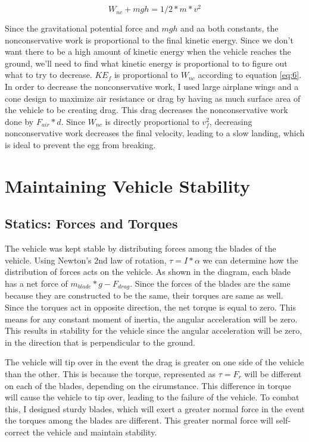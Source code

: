 \documentclass[12pt]{report}
\begin{document}
\begin{equation} \label{eq:6}
W_{nc}+mgh = 1/2*m*v^2
\end{equation}

Since the gravitational potential force and $mgh$ and aa both constants, the nonconservative work is proportional to the final kinetic energy. Since we don't want there to be a high amount of kinetic energy when the vehicle reaches the ground, we'll need to find what kinetic energy is proportional to to figure out what to try to decrease. $KE_f$ is proportional to $W_{nc}$ according to equation \ref{eq:6}. In order to decrease the nonconservative work, I used large airplane wings and a cone design to maximize air resistance or drag by having as much surface area of the vehicle to be creating drag. This drag decreases the nonconservative work done by $F_{air}*d$. Since $W_{nc}$ is directly proportional to $v_f^2$, decreasing nonconservative work decreases the final velocity, leading to a slow landing, which is ideal to prevent the egg from breaking.



\chapter{Maintaining Vehicle Stability}
\section{Statics: Forces and Torques}
The vehicle was kept stable by distributing forces among the blades of the vehicle. Using Newton's 2nd law of rotation, $\tau = I*\alpha$ we can determine how the distribution of forces acts on the vehicle. As shown in the diagram, each blade has a net force of $m_{blade}*g - F_{drag}$. Since the forces of the blades are the same because they are constructed to be the same, their torques are same as well. Since the torques act in opposite direction, the net torque is equal to zero. This means for any constant moment of inertia, the angular acceleration will be zero. This results in stability for the vehicle since the angular acceleration will be zero, in the direction that is perpendicular to the ground.

The vehicle will tip over in the event the drag is greater on one side of the vehicle than the other. This is because the torque, represented as $\tau = F_r$ will be different on each of the blades, depending on the cirumstance. This difference in torque will cause the vehicle to tip over, leading to the failure of the vehicle. To combat this, I designed sturdy blades, which will exert a greater normal force in the event the torques among the blades are different. This greater normal force will self-correct the vehicle and maintain stability.
\end{document}
